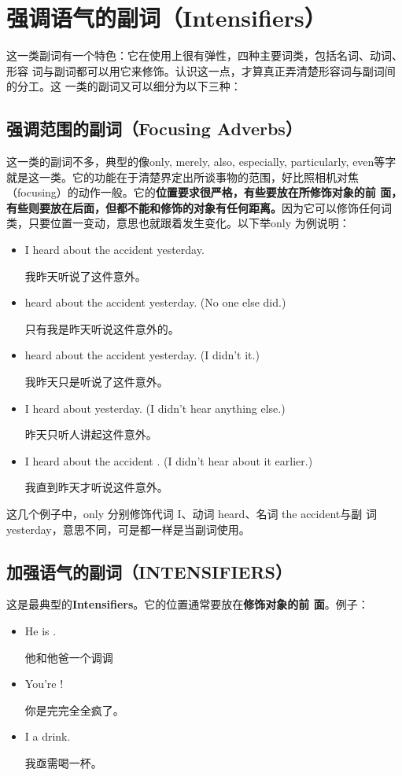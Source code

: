\section{强调语气的副词（Intensifiers）}

这一类副词有一个特色：它在使用上很有弹性，四种主要词类，包括名词、动词、形容
词与副词都可以用它来修饰。认识这一点，才算真正弄清楚形容词与副词间的分工。这
一类的副词又可以细分为以下三种：

\subsection{强调范围的副词（Focusing Adverbs）}

这一类的副词不多，典型的像only, merely, also, especially, particularly,
even等字就是这一类。它的功能在于清楚界定出所谈事物的范围，好比照相机对焦
（focusing）的动作一般。它的\textbf{位置要求很严格，有些要放在所修饰对象的前
  面，有些则要放在后面，但都不能和修饰的对象有任何距离。}因为它可以修饰任何词
类，只要位置一变动，意思也就跟着发生变化。以下举only 为例说明：
\begin{itemize}
\item I heard about the accident yesterday.

  我昨天听说了这件意外。
\item {} heard about the accident yesterday. (No one else did.)

  只有我是昨天听说这件意外的。
\item {} heard about the accident yesterday. (I didn't it.)

  我昨天只是听说了这件意外。
\item I heard about  yesterday. (I didn't hear anything
  else.)

  昨天只听人讲起这件意外。
\item I heard about the accident . (I didn't hear about it
  earlier.)

  我直到昨天才听说这件意外。
\end{itemize}
这几个例子中，only 分别修饰代词 I、动词 heard、名词 the accident与副
词 yesterday，意思不同，可是都一样是当副词使用。

\subsection{加强语气的副词（INTENSIFIERS）}

这是最典型的\textbf{Intensifiers}。它的位置通常要放在\textbf{修饰对象的前
  面}。例子：
\begin{itemize}
\item He is  .

  他和他爸一个调调
\item You're  !

  你是完完全全疯了。
\item  I   a drink.

  我亟需喝一杯。
\end{itemize}

